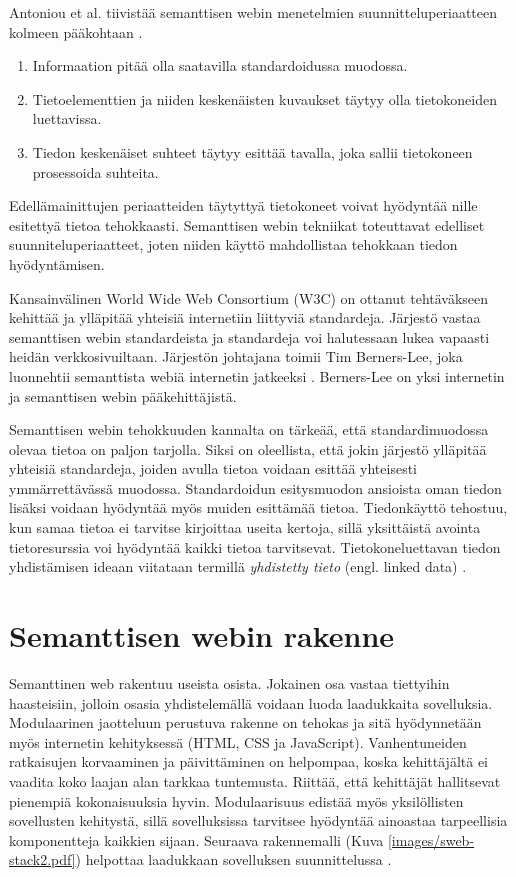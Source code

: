 \documentclass[finnish, 12pt, a4paper, elec, utf8, pdfa, online]{aaltothesis}
\begin{document}
Antoniou et al. tiivistää semanttisen webin menetelmien suunnitteluperiaatteen kolmeen pääkohtaan \cite{Antoniou}.
\vspace{-0.1cm}
\begin{enumerate}
  \item  Informaation pitää olla saatavilla standardoidussa muodossa.
  \item  Tietoelementtien ja niiden keskenäisten kuvaukset täytyy olla tietokoneiden luettavissa.
  \item  Tiedon keskenäiset suhteet täytyy esittää tavalla, joka sallii tietokoneen prosessoida suhteita.
\end{enumerate}
\vspace{-0.1cm}
Edellämainittujen periaatteiden täytyttyä tietokoneet voivat hyödyntää nille esitettyä tietoa tehokkaasti. Semanttisen webin tekniikat toteuttavat edelliset suunniteluperiaatteet, joten niiden käyttö mahdollistaa tehokkaan tiedon hyödyntämisen.

Kansainvälinen World Wide Web Consortium (W3C) on ottanut tehtäväkseen kehittää ja ylläpitää yhteisiä internetiin liittyviä standardeja. Järjestö vastaa semanttisen webin standardeista ja standardeja voi halutessaan lukea vapaasti heidän verkkosivuiltaan. Järjestön johtajana toimii Tim Berners-Lee, joka luonnehtii semanttista webiä internetin jatkeeksi \cite{W3C} \cite{Berners_visio}. Berners-Lee on yksi internetin ja semanttisen webin pääkehittäjistä.

Semanttisen webin tehokkuuden kannalta on tärkeää, että standardimuodossa olevaa tietoa on paljon tarjolla. Siksi on oleellista, että jokin järjestö ylläpitää yhteisiä standardeja, joiden avulla tietoa voidaan esittää yhteisesti ymmärrettävässä muodossa. Standardoidun esitysmuodon ansioista oman tiedon lisäksi voidaan hyödyntää myös muiden esittämää tietoa. Tiedonkäyttö tehostuu, kun samaa tietoa ei tarvitse kirjoittaa useita kertoja, sillä yksittäistä avointa tietoresurssia voi hyödyntää kaikki tietoa tarvitsevat. Tietokoneluettavan tiedon yhdistämisen ideaan viitataan termillä \textit{yhdistetty tieto} (engl. linked data) \cite{linked_w3c} \cite{linked_data_finlad}.

\clearpage
\section{Semanttisen webin rakenne}
Semanttinen web rakentuu useista osista. Jokainen osa vastaa tiettyihin haasteisiin, jolloin osasia yhdistelemällä voidaan luoda laadukkaita sovelluksia. Modulaarinen jaotteluun perustuva rakenne on tehokas ja sitä hyödynnetään myös internetin kehityksessä (HTML, CSS ja JavaScript). Vanhentuneiden ratkaisujen korvaaminen ja päivittäminen on helpompaa, koska kehittäjältä ei vaadita koko laajan alan tarkkaa tuntemusta. Riittää, että kehittäjät hallitsevat pienempiä kokonaisuuksia hyvin. Modulaarisuus edistää myös yksilöllisten sovellusten kehitystä, sillä sovelluksissa tarvitsee hyödyntää ainoastaa tarpeellisia komponentteja kaikkien sijaan. Seuraava rakennemalli (Kuva \ref{images/sweb-stack2.pdf}) helpottaa laadukkaan sovelluksen suunnittelussa \cite{stack}.
\end{document}
